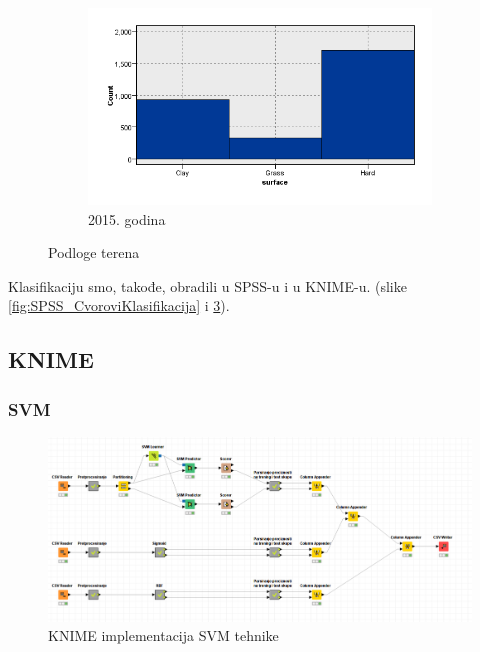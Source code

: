 \documentclass[a4paper]{article}
\begin{document}
\begin{figure}[H]
	\begin{subfigure}[h]{\textwidth}
		\begin{center}
			\includegraphics[scale=0.30]{Klasifikacija/HistogramiPodlogaTerena/Graphboard2015.png}
		\end{center}
		\caption{2015. godina}
		\label{fig:Podloga2015}
	\end{subfigure}
	
	\caption{Podloge terena}
	\label{fig:Podloga}
\end{figure} 

Klasifikaciju smo, takođe, obradili u SPSS-u i u KNIME-u. (slike \ref{fig:SPSS_CvoroviKlasifikacija} i \ref{fig:KNIME_CvoroviKlasifikacija}).

\subsection{KNIME}

\subsubsection{SVM}

\begin{figure}[h!]
	\begin{center}
		\includegraphics[scale=0.30]{KNIME_project/SVM/SVM_knime}
	\end{center}
	\caption{KNIME implementacija SVM tehnike}
	\label{fig:KNIME_CvoroviKlasifikacija}
\end{figure}
\end{document}
